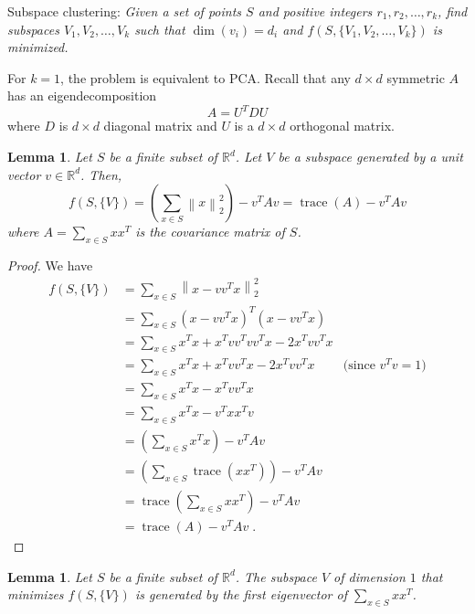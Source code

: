 \documentclass[12pt]{article}
\newtheorem{lemma}[theorem]{Lemma}
\newcommand{\R}{\mathbb{R}}
\newcommand{\norm}[1]{\left\|#1\right\|}
\DeclareMathOperator*{\trace}{trace}
\begin{document}
Subspace clustering: \emph{Given a set of points $S$ and positive integers
$r_1, r_2, \dots, r_k$, find subspaces $V_1, V_2, \dots, V_k$ such that
$\dim(v_i) = d_i$ and $f(S, \{V_1, V_2, \dots, V_k\})$ is minimized.}

For $k=1$, the problem is equivalent to PCA. Recall that any $d \times d$
symmetric $A$ has an eigendecomposition
$$
A = U^T D U
$$
where $D$ is $d \times d$ diagonal matrix and $U$ is a $d \times d$
orthogonal matrix.

\begin{lemma}
Let $S$ be a finite subset of $\R^d$. Let $V$ be a subspace
generated by a unit vector $v \in \R^d$. Then,
$$
f(S,\{V\})
= \left(\sum_{x \in S} \norm{x}_2^2 \right) - v^T A v
= \trace(A) - v^T A v
$$
where $A = \sum_{x \in S} xx^T$ is the covariance matrix of $S$.
\end{lemma}

\begin{proof}
We have
\begin{align*}
f(S, \{V\})
& = \sum_{x \in S} \norm{x - vv^T x}_2^2 \\
& = \sum_{x \in S} (x - vv^T x)^T (x - vv^Tx) \\
& = \sum_{x \in S} x^Tx + x^T vv^T vv^T x - 2 x^T vv^T x  \\
& = \sum_{x \in S} x^Tx + x^T vv^T x - 2 x^T vv^T x & \text{(since $v^Tv = 1$)} \\
& = \sum_{x \in S} x^Tx - x^T vv^T x  \\
& = \sum_{x \in S} x^Tx - v^T xx^T v  \\
& = \left(\sum_{x \in S} x^Tx \right) - v^T A v  \\
& = \left(\sum_{x \in S} \trace(xx^T) \right) - v^T A v \\
& = \trace \left(\sum_{x \in S} xx^T \right) - v^T A v \\
& = \trace(A) - v^T A v \; .
\end{align*}
\end{proof}

\begin{lemma}
Let $S$ be a finite subset of $\R^d$.
The subspace $V$ of dimension $1$ that minimizes $f(S, \{V\})$ is generated
by the first eigenvector of $\sum_{x \in S} xx^T$.
\end{lemma}
\end{document}
